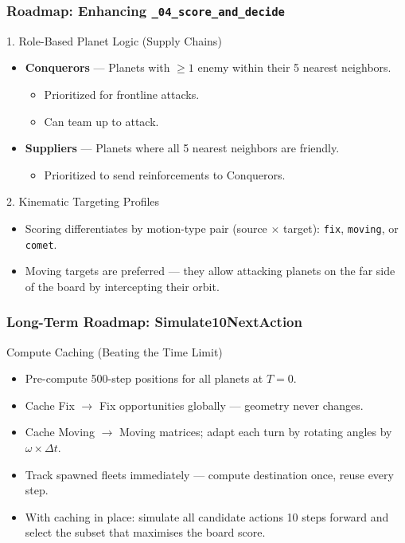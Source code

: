 \documentclass[aspectratio=169]{beamer}
\begin{document}
\begin{frame}
    \frametitle{Roadmap: Enhancing \texttt{\_04\_score\_and\_decide}}
    \begin{block}{1. Role-Based Planet Logic (Supply Chains)}
        \begin{itemize}
            \item \textbf{Conquerors} --- Planets with $\ge 1$ enemy within their 5 nearest neighbors.
            \begin{itemize}
                \item Prioritized for frontline attacks.
                \item Can team up to attack.
            \end{itemize}
            \item \textbf{Suppliers} --- Planets where all 5 nearest neighbors are friendly.
            \begin{itemize}
                \item Prioritized to send reinforcements to Conquerors.
            \end{itemize}
        \end{itemize}
    \end{block}

    \begin{block}{2. Kinematic Targeting Profiles}
        \begin{itemize}
            \item Scoring differentiates by motion-type pair (source $\times$ target):
                  \texttt{fix}, \texttt{moving}, or \texttt{comet}.
            \item Moving targets are preferred --- they allow attacking planets on the far side
                  of the board by intercepting their orbit.
        \end{itemize}
    \end{block}
\end{frame}

\begin{frame}
    \frametitle{Long-Term Roadmap: Simulate10NextAction}
    \begin{block}{Compute Caching (Beating the Time Limit)}
        \begin{itemize}
            \item Pre-compute 500-step positions for all planets at $T=0$.
            \item Cache Fix $\rightarrow$ Fix opportunities globally --- geometry never changes.
            \item Cache Moving $\rightarrow$ Moving matrices; adapt each turn by rotating angles
                  by $\omega \times \Delta t$.
            \item Track spawned fleets immediately --- compute destination once, reuse every step.
            \item With caching in place: simulate all candidate actions 10 steps forward
                  and select the subset that maximises the board score.
        \end{itemize}
    \end{block}
\end{frame}
\end{document}
